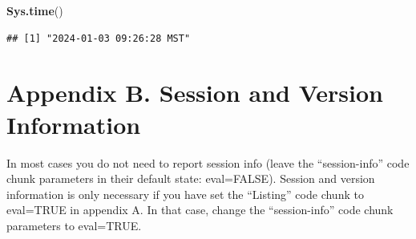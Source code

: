 \documentclass[
]{article}
\newenvironment{Shaded}{\begin{snugshade}}{\end{snugshade}}
\newcommand{\FunctionTok}[1]{\textcolor[rgb]{0.13,0.29,0.53}{\textbf{#1}}}
\newcommand{\NormalTok}[1]{#1}
\begin{document}
\begin{Shaded}
\begin{Highlighting}[]
\FunctionTok{Sys.time}\NormalTok{()}
\end{Highlighting}
\end{Shaded}

\begin{verbatim}
## [1] "2024-01-03 09:26:28 MST"
\end{verbatim}

\pagebreak

\hypertarget{appendix-b.-session-and-version-information}{%
\section{Appendix B. Session and Version
Information}\label{appendix-b.-session-and-version-information}}

In most cases you do not need to report session info (leave the
``session-info'' code chunk parameters in their default state:
eval=FALSE). Session and version information is only necessary if you
have set the ``Listing'' code chunk to eval=TRUE in appendix A. In that
case, change the ``session-info'' code chunk parameters to eval=TRUE.
\end{document}

